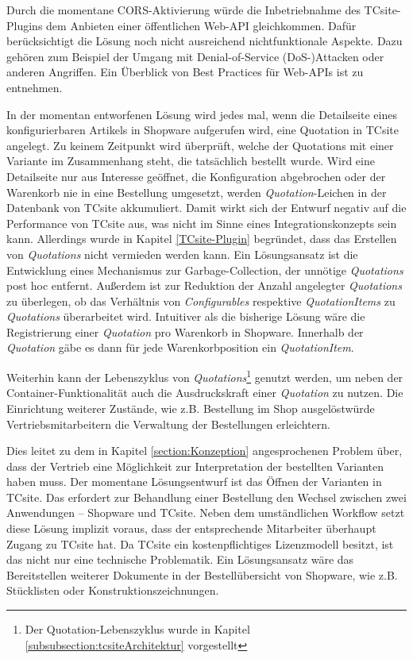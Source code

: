 \documentclass[11pt, a4paper, titlepage, listof=totoc, bibliography=totoc, index=totoc, twoside, openright, headings=normal, draft]{scrreprt}
\begin{document}
Durch die momentane CORS-Aktivierung würde die Inbetriebnahme des TCsite-Plugins dem Anbieten einer öffentlichen Web-API gleichkommen. Dafür berücksichtigt die Lösung noch nicht ausreichend nichtfunktionale Aspekte. Dazu gehören zum Beispiel der Umgang mit Denial-of-Service (DoS-)Attacken oder anderen Angriffen. Ein Überblick von Best Practices für Web-APIs ist \citet{tilkov11} zu entnehmen.

In der momentan entworfenen Lösung wird jedes mal, wenn die Detailseite eines konfigurierbaren Artikels in Shopware aufgerufen wird, eine Quotation in TCsite angelegt. Zu keinem Zeitpunkt wird überprüft, welche der Quotations mit einer Variante im Zusammenhang steht, die tatsächlich bestellt wurde. Wird eine Detailseite nur aus Interesse geöffnet, die Konfiguration abgebrochen oder der Warenkorb nie in eine Bestellung umgesetzt, werden \glqq \emph{Quotation}-Leichen\grqq{} in der Datenbank von TCsite akkumuliert. Damit wirkt sich der Entwurf negativ auf die Performance von TCsite aus, was nicht im Sinne eines Integrationskonzepts sein kann. Allerdings wurde in Kapitel \ref{TCsite-Plugin} begründet, dass das Erstellen von \emph{Quotations} nicht vermieden werden kann. Ein Lösungsansatz ist die Entwicklung eines Mechanismus zur Garbage-Collection, der unnötige \emph{Quotations} post hoc entfernt. Außerdem ist zur Reduktion der Anzahl angelegter \emph{Quotations} zu überlegen, ob das Verhältnis von \emph{Configurables} respektive \emph{QuotationItems} zu \emph{Quotations} überarbeitet wird. Intuitiver als die bisherige Lösung wäre die Registrierung einer \emph{Quotation} pro Warenkorb in Shopware. Innerhalb der \emph{Quotation} gäbe es dann für jede Warenkorbposition ein \emph{QuotationItem}.

Weiterhin kann der Lebenszyklus von \emph{Quotations}\footnote{Der Quotation-Lebenszyklus wurde in Kapitel \ref{subsubsection:tcsiteArchitektur} vorgestellt} genutzt werden, um neben der Container-Funktionalität auch die Ausdruckskraft einer \emph{Quotation} zu nutzen. Die Einrichtung weiterer Zustände, wie z.B. \glqq Bestellung im Shop ausgelöst\grqq würde Vertriebsmitarbeitern die Verwaltung der Bestellungen erleichtern.

Dies leitet zu dem in Kapitel \ref{section:Konzeption} angesprochenen Problem über, dass der Vertrieb eine Möglichkeit zur Interpretation der bestellten Varianten haben muss. Der momentane Lösungsentwurf ist das Öffnen der Varianten in TCsite. Das erfordert zur Behandlung einer Bestellung den Wechsel zwischen zwei Anwendungen -- Shopware und TCsite. Neben dem umständlichen Workflow setzt diese Lösung implizit voraus, dass der entsprechende Mitarbeiter überhaupt Zugang zu TCsite hat. Da TCsite ein kostenpflichtiges Lizenzmodell besitzt, ist das nicht nur eine technische Problematik. Ein Lösungsansatz wäre das Bereitstellen weiterer Dokumente in der Bestellübersicht von Shopware, wie z.B. Stücklisten oder Konstruktionszeichnungen.
\end{document}
